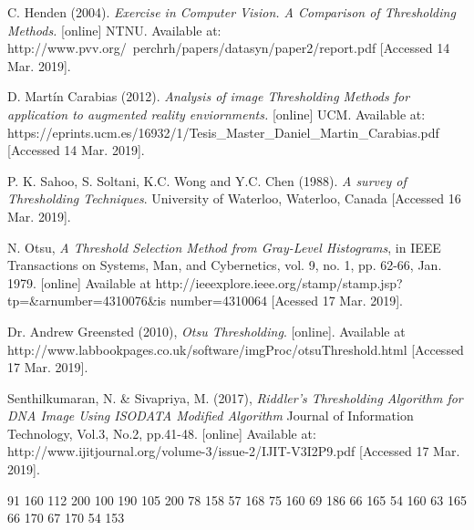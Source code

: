 \documentclass[12]{article}
\begin{document}
\begin{thebibliography}{100}

C. Henden (2004). \textit{ Exercise in Computer Vision. A Comparison of Thresholding Methods.} [online] NTNU. Available at: http://www.pvv.org/~perchrh/papers/datasyn/paper2/report.pdf [Accessed 14 Mar. 2019].


D. Martín Carabias (2012). \textit{Analysis of image Thresholding Methods for application to augmented reality enviornments.} [online] UCM. Available at: https://eprints.ucm.es/16932/1/Tesis\_Master\_Daniel\_Martin\_Carabias.pdf [Accessed 14 Mar. 2019].


P. K. Sahoo, S. Soltani, K.C. Wong and Y.C. Chen (1988). \textit{A survey of Thresholding Techniques}. University of Waterloo, Waterloo, Canada  [Accessed 16 Mar. 2019].

\bibitem{}N. Otsu, \textit{A Threshold Selection Method from Gray-Level Histograms}, in IEEE Transactions on Systems, Man, and Cybernetics, vol. 9, no. 1, pp. 62-66, Jan. 1979.
[online] Available at http://ieeexplore.ieee.org/stamp/stamp.jsp?tp=\&arnumber=4310076\&is
number=4310064 [Acessed 17 Mar. 2019].

\bibitem{}Dr. Andrew Greensted (2010), \textit{Otsu Thresholding}. [online]. Available at http://www.labbookpages.co.uk/software/imgProc/otsuThreshold.html [Accessed 17 Mar. 2019].

\bibitem{}Senthilkumaran,  N.  \&  Sivapriya,  M.  (2017),  \textit{Riddler's  Thresholding Algorithm  for  DNA  Image  Using  ISODATA  Modified  Algorithm} Journal  of Information Technology, Vol.3, No.2, pp.41-48. [online] Available at: http://www.ijitjournal.org/volume-3/issue-2/IJIT-V3I2P9.pdf [Accessed 17 Mar. 2019].

\end{thebibliography}

91 160
112 200
100 190
105 200
78 158
57 168
75 160
69 186
66 165
54 160
63 165
66 170
67 170
54 153
\end{document}
